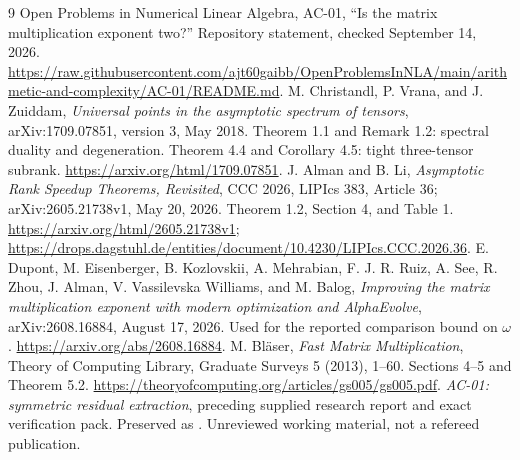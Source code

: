 \documentclass[11pt]{article}
\theoremstyle{definition}\newtheorem{definition}[theorem]{Definition}
\theoremstyle{remark}\newtheorem{remark}[theorem]{Remark}
\newcommand{\file}[1]{\texttt{\detokenize{#1}}}
\begin{document}
\begin{thebibliography}{9}
 Open Problems in Numerical Linear Algebra, AC-01, ``Is the matrix multiplication exponent two?'' Repository statement, checked September 14, 2026.\newline
\url{https://raw.githubusercontent.com/ajt60gaibb/OpenProblemsInNLA/main/arithmetic-and-complexity/AC-01/README.md}.
 M. Christandl, P. Vrana, and J. Zuiddam, \emph{Universal points in the asymptotic spectrum of tensors}, arXiv:1709.07851, version 3, May 2018. Theorem 1.1 and Remark 1.2: spectral duality and degeneration. Theorem 4.4 and Corollary 4.5: tight three-tensor subrank.\newline
\url{https://arxiv.org/html/1709.07851}.
 J. Alman and B. Li, \emph{Asymptotic Rank Speedup Theorems, Revisited}, CCC 2026, LIPIcs 383, Article 36; arXiv:2605.21738v1, May 20, 2026. Theorem 1.2, Section 4, and Table 1.\newline
\url{https://arxiv.org/html/2605.21738v1};\newline
\url{https://drops.dagstuhl.de/entities/document/10.4230/LIPIcs.CCC.2026.36}.
 E. Dupont, M. Eisenberger, B. Kozlovskii, A. Mehrabian, F. J. R. Ruiz, A. See, R. Zhou, J. Alman, V. Vassilevska Williams, and M. Balog, \emph{Improving the matrix multiplication exponent with modern optimization and AlphaEvolve}, arXiv:2608.16884, August 17, 2026. Used for the reported comparison bound on $\omega$.\newline
\url{https://arxiv.org/abs/2608.16884}.
 M. Bl\"aser, \emph{Fast Matrix Multiplication}, Theory of Computing Library, Graduate Surveys 5 (2013), 1--60. Sections 4--5 and Theorem 5.2.\newline
\url{https://theoryofcomputing.org/articles/gs005/gs005.pdf}.
 \emph{AC-01: symmetric residual extraction}, preceding supplied research report and exact verification pack. Preserved as \file{prior/AC01_round2_research_pack.zip}. Unreviewed working material, not a refereed publication.
\end{thebibliography}
\end{document}
